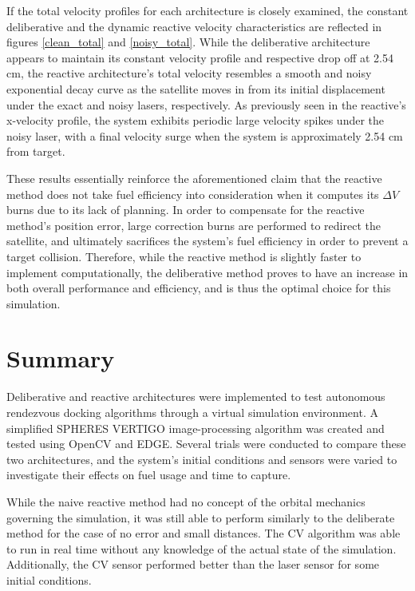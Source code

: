 \documentclass[journal, 10pt]{IEEEtran}
\begin{document}
If the total velocity profiles for each architecture is closely examined, the constant deliberative and the dynamic reactive velocity characteristics are reflected in figures \ref{clean_total} and \ref{noisy_total}. While the deliberative architecture appears to maintain its constant velocity profile and respective drop off at 2.54 cm, the reactive architecture's total velocity resembles a smooth and noisy exponential decay curve as the satellite moves in from its initial displacement under the exact and noisy lasers, respectively. As previously seen in the reactive's x-velocity profile, the system exhibits periodic large velocity spikes under the noisy laser, with a final velocity surge when the system is approximately 2.54 cm from target. 

These results essentially reinforce the aforementioned claim that the reactive method does not take fuel efficiency into consideration when it computes its $\Delta V$  burns due to its lack of planning. In order to compensate for the reactive method's position error, large correction burns are performed to redirect the satellite, and ultimately sacrifices the system's fuel efficiency in order to prevent a target collision. Therefore, while the reactive method is slightly faster to implement computationally, the deliberative method proves to have an increase in both overall performance and efficiency, and is thus the optimal choice for this simulation. 

\section{Summary}
Deliberative and reactive architectures were implemented to test autonomous rendezvous docking algorithms through a virtual simulation environment. A simplified SPHERES VERTIGO image-processing algorithm was created and tested using OpenCV and EDGE. Several trials were conducted to compare these two architectures, and the system's initial conditions and sensors were varied to investigate their effects on fuel usage and time to capture.

While the naive reactive method had no concept of the orbital mechanics governing the simulation, it was still able to perform similarly to the deliberate method for the case of no error and small distances. The CV algorithm was able to run in real time without any knowledge of the actual state of the simulation. Additionally, the CV sensor performed better than the laser sensor for some initial conditions.
\end{document}
